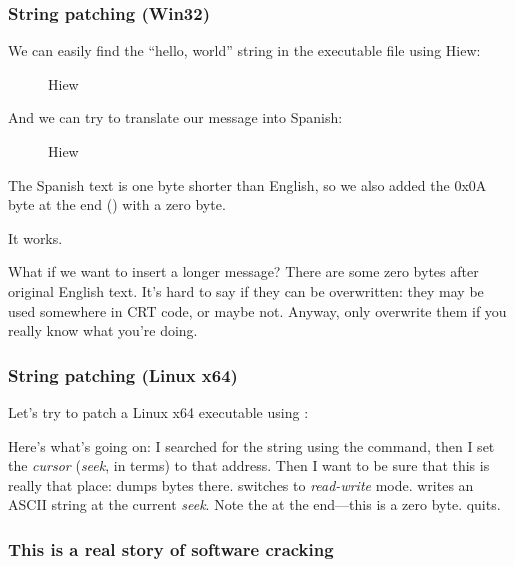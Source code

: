 \subsubsection{String patching (Win32)}

We can easily find the ``hello, world'' string in the executable file using Hiew:

\begin{figure}[H]
\centering
{}
\caption{Hiew}
\label{}
\end{figure}

And we can try to translate our message into Spanish:

\begin{figure}[H]
\centering
{}
\caption{Hiew}
\label{}
\end{figure}

The Spanish text is one byte shorter than English, so we also added the 0x0A byte at the end () with a zero byte.

It works.

What if we want to insert a longer message?
There are some zero bytes after original English text.
It's hard to say if they can be overwritten: they may be used somewhere in \ac{CRT} code, or maybe not.
Anyway, only overwrite them if you really know what you're doing.

\subsubsection{String patching (Linux x64)}

\myindex{\radare}
Let's try to patch a Linux x64 executable using \radare{}:



Here's what's going on: I searched for the  string using the \TT{/} command,
then I set the \emph{cursor} (\emph{seek}, in \radare{} terms) to that address.
Then I want to be sure that this is really that place:  dumps bytes there.
 switches \radare{} to \emph{read-write} mode.
 writes an ASCII string at the current \emph{seek}.
Note the  at the end---this is a zero byte.
 quits.

\subsubsection{This is a real story of software cracking}
\myindex{\SoftwareCracking}

